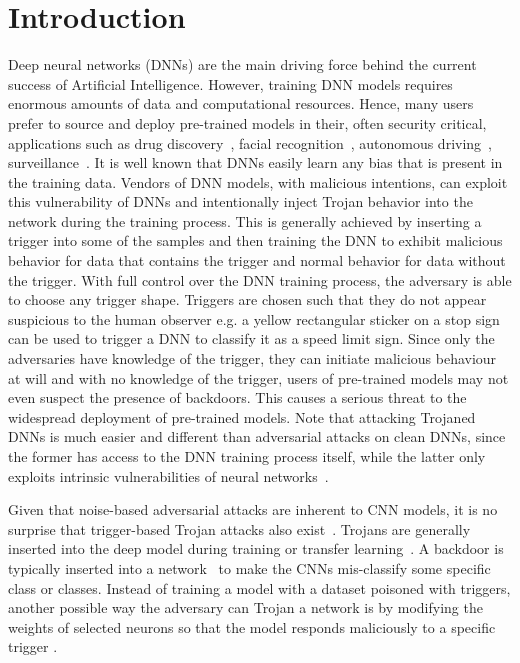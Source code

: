 \documentclass{article}
\begin{document}
\section{Introduction}
\vspace{-3mm}
Deep neural networks (DNNs) are the main driving force behind the current success of Artificial Intelligence. However, training DNN models requires enormous amounts of data and computational resources. Hence, many users prefer to source and deploy pre-trained models in their, often security critical, applications such as drug discovery~\cite{chen2018rise,zhang2018seq3seq}, facial recognition~\cite{sun2015deepid3}, autonomous driving~\cite{geiger2012we}, surveillance~\cite{javed2002tracking}. It is well known that DNNs easily learn any bias that is present in the training data. Vendors of DNN models, with malicious intentions, can exploit this vulnerability of DNNs and intentionally inject Trojan behavior into the network during the training process. This is generally achieved by inserting a trigger into some of the  samples and then training the DNN to exhibit malicious behavior for data that contains the trigger and normal behavior for data without the trigger. With full control over the DNN training process, the adversary is able to choose any trigger shape. Triggers are chosen such that they do not appear suspicious to the human observer e.g. a yellow rectangular sticker on a stop sign can be used to trigger a DNN to classify it as a speed limit sign.  Since only the adversaries have knowledge of the trigger, they can initiate malicious behaviour at will and with no knowledge of the trigger, users of pre-trained models may not even suspect the presence of backdoors. This causes a serious threat to the widespread deployment of pre-trained models. Note that attacking Trojaned DNNs is much easier and different than adversarial attacks on clean DNNs, since the former has access to the DNN training process itself, while the latter only exploits intrinsic vulnerabilities of neural networks~\cite{akhtar2018threat}.   









Given that noise-based adversarial attacks are inherent to CNN models, it is no surprise that trigger-based Trojan attacks also exist~\cite{yuan2019adversarial,tramer2017ensemble}. Trojans are generally inserted into the deep model during training or transfer learning~\cite{liu2020survey,liu2017trojaning,evtimov2017robust,chen2017targeted}. A backdoor is typically inserted into a network~\cite{gu2017badnets} to make the CNNs mis-classify some specific class or classes. Instead of training a model with a dataset poisoned with triggers, another possible way the adversary can Trojan a network is by modifying the weights of selected neurons so that the model responds maliciously to a specific trigger \cite{liu2017trojaning}.  
\end{document}
